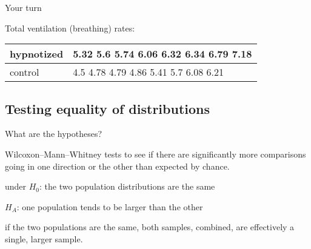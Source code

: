 \begin{frame}{Your turn}

    Total ventilation (breathing) rates:

  \begin{center}
  \begin{tabular}{l|p{5in}}
    hypnotized & 5.32 \hspace{.25em} 5.6 \hspace{.25em} 5.74 \hspace{.25em} 6.06 \hspace{.25em} 6.32 \hspace{.25em} 6.34 \hspace{.25em} 6.79 \hspace{.25em} 7.18 \hspace{.25em} \\
    \hline
    control & 4.5 \hspace{.25em} 4.78 \hspace{.25em} 4.79 \hspace{.25em} 4.86 \hspace{.25em} 5.41 \hspace{.25em} 5.7 \hspace{.25em} 6.08 \hspace{.25em} 6.21 \hspace{.25em} \\
  \end{tabular}
  \end{center}
  

\end{frame}

\subsection{Testing equality of distributions}

\begin{frame}{What are the hypotheses?}

  Wilcoxon--Mann--Whitney tests to see if there are \alert{significantly} more comparisons going in one direction or the other than expected \alert{by chance}.

    \vspace{2em}

     under $H_0$: the two population distributions are the same

    \vspace{2em}

     $H_A$: one population tends to be larger than the other

    \vspace{2em}

     if the two populations are the same, both samples, combined, are effectively a single, larger sample.

\end{frame}


